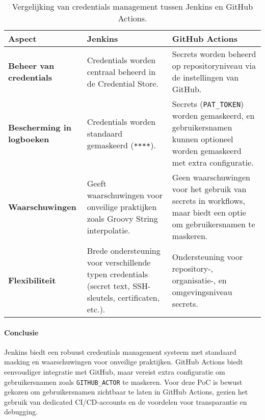 \begin{table}[h!]
    \centering
    \begin{tabular}{|p{4cm}|p{5cm}|p{5cm}|}
        \hline
        \textbf{Aspect}               & \textbf{Jenkins}                                                                                                 & \textbf{GitHub Actions}                                                                                        \\ \hline
        \textbf{Beheer van credentials} & Credentials worden centraal beheerd in de Credential Store.                                                & Secrets worden beheerd op repositoryniveau via de instellingen van GitHub.                               \\ \hline
        \textbf{Bescherming in logboeken} & Credentials worden standaard gemaskeerd (\texttt{****}).                                                       & Secrets (\texttt{PAT\_TOKEN}) worden gemaskeerd, en gebruikersnamen kunnen optioneel worden gemaskeerd met extra configuratie. \\ \hline
        \textbf{Waarschuwingen}         & Geeft waarschuwingen voor onveilige praktijken zoals Groovy String interpolatie.                          & Geen waarschuwingen voor het gebruik van secrets in workflows, maar biedt een optie om gebruikersnamen te maskeren. \\ \hline
        \textbf{Flexibiliteit}          & Brede ondersteuning voor verschillende typen credentials (secret text, SSH-sleutels, certificaten, etc.). & Ondersteuning voor repository-, organisatie-, en omgevingsniveau secrets.                                                                 \\ \hline
    \end{tabular}
    \caption{Vergelijking van credentials management tussen Jenkins en GitHub Actions.}
    \label{tab:credentials_comparison}
\end{table}

\paragraph{Conclusie}

Jenkins biedt een robuust credentials management systeem met standaard masking en waarschuwingen voor onveilige praktijken. GitHub Actions biedt eenvoudiger integratie met GitHub, maar vereist extra configuratie om gebruikersnamen zoals \texttt{GITHUB\_ACTOR} te maskeren. Voor deze PoC is bewust gekozen om gebruikersnamen zichtbaar te laten in GitHub Actions, gezien het gebruik van dedicated CI/CD-accounts en de voordelen voor transparantie en debugging.

